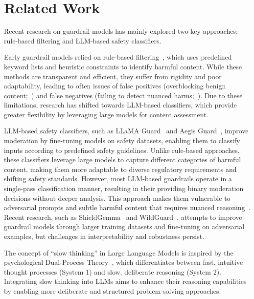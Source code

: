 \section{Related Work}
Recent research on guardrail models has mainly explored two key approaches: rule-based filtering and LLM-based safety classifiers.

Early guardrail models relied on rule-based filtering~\cite{welbl-etal-2021-challenges-detoxifying, clarke-etal-2023-rule,DBLP:conf/fat/GomezMPC24}, which uses predefined keyword lists and heuristic constraints to identify harmful content. While these methods are transparent and efficient, they suffer from rigidity and poor adaptability, leading to often issues of false positives (overblocking benign content;~\cite{DBLP:conf/chi/SongLLKK23}) and false negatives (failing to detect nuanced harms;~\cite{DBLP:journals/corr/abs-2212-05926}). Due to these limitations, research has shifted towards LLM-based classifiers, which provide greater flexibility by leveraging large models for content assessment.

LLM-based safety classifiers, such as LLaMA Guard~\cite{DBLP:journals/corr/abs-2312-06674, DBLP:journals/corr/abs-2411-17713, DBLP:journals/corr/abs-2411-10414} and Aegis Guard~\cite{DBLP:journals/corr/abs-2404-05993}, improve moderation by fine-tuning models on safety datasets, enabling them to classify inputs according to predefined safety guidelines. Unlike rule-based approaches, these classifiers leverage large models to capture different categories of harmful content, making them more adaptable to diverse regulatory requirements and shifting safety standards. However, most LLM-based guardrails operate in a single-pass classification manner, resulting in their providing binary moderation decisions without deeper analysis. This approach makes them vulnerable to adversarial prompts and subtle harmful content that requires nuanced reasoning~\cite{DBLP:journals/corr/abs-2309-02705, DBLP:conf/lamps/Zhu0ZW0WY000024}. Recent research, such as ShieldGemma~\cite{DBLP:journals/corr/abs-2407-21772} and WildGuard~\cite{DBLP:conf/nips/HanREJL00D24}, attempts to improve guardrail models through larger training datasets and fine-tuning on adversarial examples, but challenges in interpretability and robustness persist.

The concept of ``slow thinking'' in Large Language Models is inspired by the psychological Dual-Process Theory~\cite{thompson2009dual}, which differentiates between fast, intuitive thought processes (System 1) and slow, deliberate reasoning (System 2). Integrating slow thinking into LLMs aims to enhance their reasoning capabilities by enabling more deliberate and structured problem-solving approaches.

